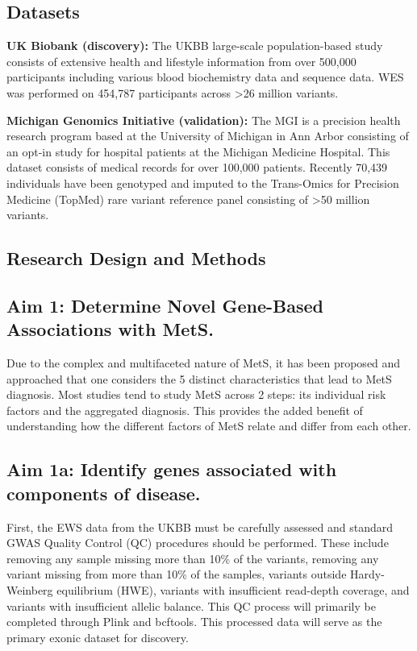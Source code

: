 \documentclass[11pt]{article}
\begin{document}
\subsection*{Datasets}

\textbf{UK Biobank (discovery):} The UKBB large-scale population-based study consists of extensive health and lifestyle information from over 500,000 participants including various blood biochemistry data and sequence data. WES was performed on 454,787 participants across >26 million variants.

\textbf{Michigan Genomics Initiative (validation):} The MGI is a precision health research program based at the University of Michigan in Ann Arbor consisting of an opt-in study for hospital patients at the Michigan Medicine Hospital. This dataset consists of medical records for over 100,000 patients. Recently 70,439 individuals have been genotyped and imputed to the Trans-Omics for Precision Medicine (TopMed) rare variant reference panel consisting of >50 million variants.


\subsection*{Research Design and Methods}

\subsection*{Aim 1: Determine Novel Gene-Based Associations with MetS.}

Due to the complex and multifaceted nature of MetS, it has been proposed and approached that one considers the 5 distinct characteristics that lead to MetS diagnosis. Most studies tend to study MetS across 2 steps: its individual risk factors and the aggregated diagnosis. This provides the added benefit of understanding how the different factors of MetS relate and differ from each other.

\subsection*{Aim 1a: Identify genes associated with components of disease.} 

First, the EWS data from the UKBB must be carefully assessed and standard GWAS Quality Control (QC) procedures should be performed. These include removing any sample missing more than 10\% of the variants, removing any variant missing from more than 10\% of the samples, variants outside Hardy-Weinberg equilibrium (HWE), variants with insufficient read-depth coverage, and variants with insufficient allelic balance. This QC process will primarily be completed through Plink and bcftools. This processed data will serve as the primary exonic dataset for discovery.
\end{document}
